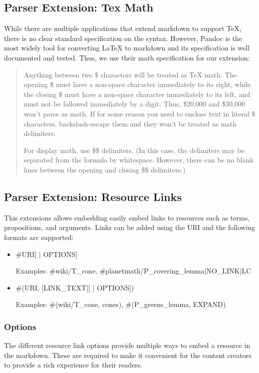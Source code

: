 \documentclass[a4paper]{article}
\begin{document}
\subsection{Parser Extension: Tex Math}
While there are multiple applications that extend markdown to support TeX, there is no clear standard specification on the syntax. However, Pandoc is the most widely tool for converting LaTeX to markdown and its specification is well documented and tested. Thus, we use their math specification for our extension:

\blockquote{Anything between two \$ characters will be treated as TeX math. The opening \$ must have a non-space character immediately to its right, while the closing \$ must have a non-space character immediately to its left, and must not be followed immediately by a digit. Thus, \$20,000 and \$30,000 won’t parse as math. If for some reason you need to enclose text in literal \$ characters, backslash-escape them and they won’t be treated as math delimiters.

For display math, use \$\$ delimiters. (In this case, the delimiters may be separated from the formula by whitespace. However, there can be no blank lines between the opening and closing \$\$ delimiters.)}

\subsection{Parser Extension: Resource Links}
This extensions allows embedding easily embed links to resources such as terms, propositions, and arguments. Links can be added using the URI and the following formats are supported:

\begin{itemize}
	\item \#URI[ $\vert$ OPTIONS]

	Examples: \#wiki/T\_cone, \#planetmath/P\_covering\_lemma$\vert$NO\_LINK$\vert$LC
	\item \#(URI, [\textquotesingle LINK\_TEXT\textquotesingle][ $\vert$ OPTIONS])
	
	Examples: \#(wiki/T\_cone, \textquotesingle cones\textquotesingle), \#(P\_greens\_lemma, EXPAND)
\end{itemize}


\subsubsection{Options}
The different resource link options provide multiple ways to embed a resource in the markdown. These are required to make it convenient for the content creators to provide a rich experience for their readers.
\end{document}
